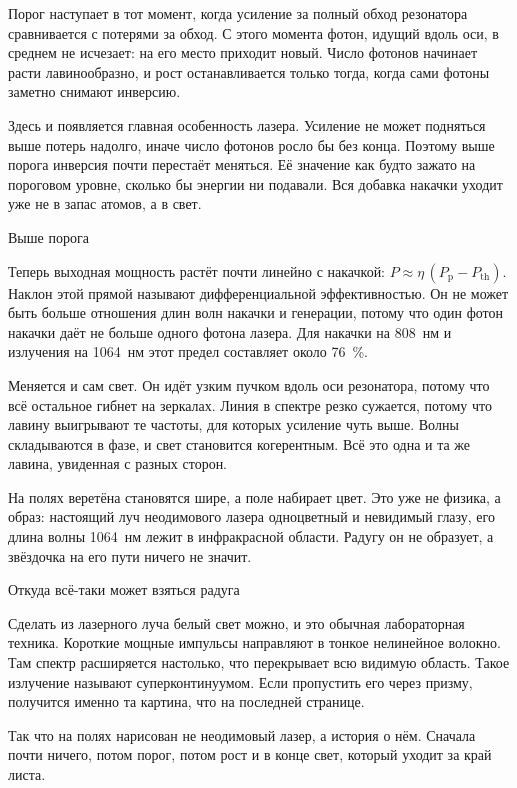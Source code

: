 \documentclass[11pt,a4paper]{article}
\makeatletter
\renewcommand\section{\@startsection{section}{1}{\z@}{-2.6ex plus -.6ex minus -.2ex}{1.2ex plus .2ex}%
  {\normalfont\large\bfseries\color{limenink}}}
\makeatother
\begin{document}
Порог наступает в тот момент, когда усиление за полный обход резонатора сравнивается с потерями за обход. С этого момента
фотон, идущий вдоль оси, в среднем не исчезает: на его место приходит новый. Число фотонов начинает расти лавинообразно,
и рост останавливается только тогда, когда сами фотоны заметно снимают инверсию.

Здесь и появляется главная особенность лазера. Усиление не может подняться выше потерь надолго, иначе число фотонов росло
бы без конца. Поэтому выше порога инверсия почти перестаёт меняться. Её значение как будто зажато на пороговом уровне,
сколько бы энергии ни подавали. Вся добавка накачки уходит уже не в запас атомов, а в свет.

\limenrule

\section{Выше порога}

Теперь выходная мощность растёт почти линейно с накачкой: $P \approx \eta\,(P_\mathrm{p} - P_\mathrm{th})$. Наклон
этой прямой называют дифференциальной эффективностью. Он не может быть больше отношения длин волн накачки и генерации,
потому что один фотон накачки даёт не больше одного фотона лазера. Для накачки на 808~нм и излучения на 1064~нм этот
предел составляет около 76~\%.

Меняется и сам свет. Он идёт узким пучком вдоль оси резонатора, потому что всё остальное гибнет на зеркалах. Линия
в спектре резко сужается, потому что лавину выигрывают те частоты, для которых усиление чуть выше. Волны складываются
в фазе, и свет становится когерентным. Всё это одна и та же лавина, увиденная с разных сторон.

На полях веретёна становятся шире, а поле набирает цвет. Это уже не физика, а образ: настоящий луч неодимового лазера
одноцветный и невидимый глазу, его длина волны 1064~нм лежит в инфракрасной области. Радугу \limenspectrum[2.5cm] он не
образует, а звёздочка \limenspark{} на его пути ничего не значит.

\section{Откуда всё-таки может взяться радуга}

Сделать из лазерного луча белый свет можно, и это обычная лабораторная техника. Короткие мощные импульсы направляют
в тонкое нелинейное волокно. Там спектр расширяется настолько, что перекрывает всю видимую область. Такое излучение
называют суперконтинуумом. Если пропустить его через призму, получится именно та картина, что на последней странице.

Так что на полях нарисован не неодимовый лазер, а история о нём. Сначала почти ничего, потом порог, потом рост и в конце
свет, который уходит за край листа.
\end{document}
